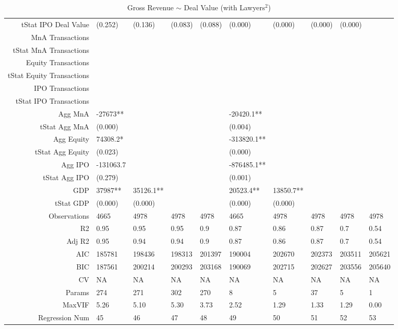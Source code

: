 \begin{table}[ht]
\begin{tabular}{rlllllllll}
  tStat IPO Deal Value & (0.252) & (0.136) & (0.083) & (0.088) & (0.000) & (0.000) & (0.000) & (0.000) &  \\ 
  MnA Transactions &  &  &  &  &  &  &  &  &  \\ 
  tStat MnA Transactions &  &  &  &  &  &  &  &  &  \\ 
  Equity Transactions &  &  &  &  &  &  &  &  &  \\ 
  tStat Equity Transactions &  &  &  &  &  &  &  &  &  \\ 
  IPO Transactions &  &  &  &  &  &  &  &  &  \\ 
  tStat IPO Transactions &  &  &  &  &  &  &  &  &  \\ 
  Agg MnA & -27673** &  &  &  & -20420.1** &  &  &  &  \\ 
  tStat Agg MnA & (0.000) &  &  &  & (0.004) &  &  &  &  \\ 
  Agg Equity & 74308.2* &  &  &  & -313820.1** &  &  &  &  \\ 
  tStat Agg Equity & (0.023) &  &  &  & (0.000) &  &  &  &  \\ 
  Agg IPO & -131063.7 &  &  &  & -876485.1** &  &  &  &  \\ 
  tStat Agg IPO & (0.279) &  &  &  & (0.001) &  &  &  &  \\ 
  GDP & 37987** & 35126.1** &  &  & 20523.4** & 13850.7** &  &  &  \\ 
  tStat GDP & (0.000) & (0.000) &  &  & (0.000) & (0.000) &  &  &  \\ 
  Observations & 4665 & 4978 & 4978 & 4978 & 4665 & 4978 & 4978 & 4978 & 4978 \\ 
  R2 & 0.95 & 0.95 & 0.95 & 0.9 & 0.87 & 0.86 & 0.87 & 0.7 & 0.54 \\ 
  Adj R2 & 0.95 & 0.94 & 0.94 & 0.9 & 0.87 & 0.86 & 0.87 & 0.7 & 0.54 \\ 
  AIC & 185781 & 198436 & 198313 & 201397 & 190004 & 202670 & 202373 & 203511 & 205621 \\ 
  BIC & 187561 & 200214 & 200293 & 203168 & 190069 & 202715 & 202627 & 203556 & 205640 \\ 
  CV & NA & NA & NA & NA & NA & NA & NA & NA & NA \\ 
  Params & 274 & 271 & 302 & 270 & 8 & 5 & 37 & 5 & 1 \\ 
  MaxVIF & 5.26 & 5.10 & 5.30 & 3.73 & 2.52 & 1.29 & 1.33 & 1.29 & 0.00 \\ 
  Regression Num & 45 & 46 & 47 & 48 & 49 & 50 & 51 & 52 & 53 \\ 
   \hline
\end{tabular}
\caption{Gross Revenue $\sim$ Deal Value (with Lawyers$^2$)} 
\end{table}
